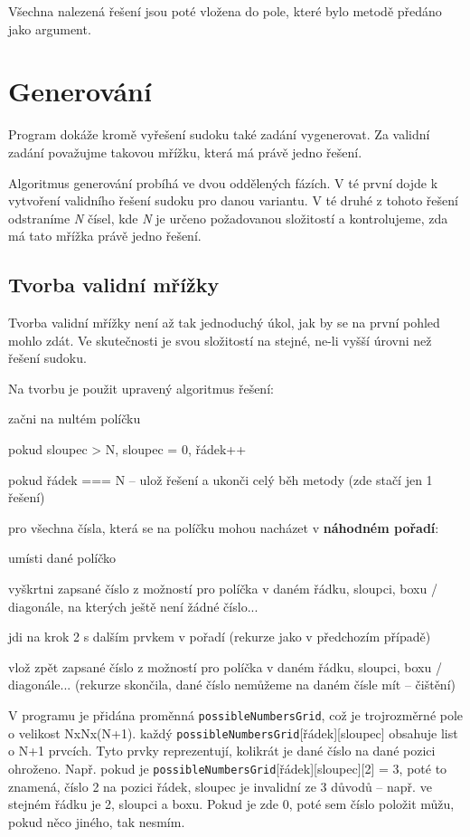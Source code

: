 \documentclass[a4paper,oneside,12pt]{report}
\begin{document}
Všechna nalezená řešení jsou poté vložena do pole, které bylo metodě předáno jako argument.

\section{Generování}
Program dokáže kromě vyřešení sudoku také zadání vygenerovat. Za validní zadání považujme takovou mřížku, která má právě jedno řešení.

Algoritmus generování probíhá ve dvou oddělených fázích. V té první dojde k vytvoření validního řešení sudoku pro danou variantu. V té druhé z tohoto řešení odstraníme \textit{N} čísel, kde \textit{N} je určeno požadovanou složitostí a kontrolujeme, zda má tato mřížka právě jedno řešení.

\subsection{Tvorba validní mřížky}
Tvorba validní mřížky není až tak jednoduchý úkol, jak by se na první pohled mohlo zdát. Ve skutečnosti je svou složitostí na stejné, ne-li vyšší úrovni než řešení sudoku.

Na tvorbu je použit upravený algoritmus řešení:
\begin{algEnumerate}
   \item začni na nultém políčku
   \item pokud sloupec > N, sloupec = 0, řádek++
   \item pokud řádek === N -- ulož řešení a ukonči celý běh metody (zde stačí jen 1 řešení)
   \item pro všechna čísla, která se na políčku mohou nacházet v \textbf{náhodném pořadí}:
   \begin{algEnumerate}
      \item umísti dané políčko
      \item vyškrtni zapsané číslo z možností pro políčka v daném řádku, sloupci, boxu / diagonále, na kterých ještě není žádné číslo...
      \item jdi na krok 2 s dalším prvkem v pořadí (rekurze jako v předchozím případě)
      \item vlož zpět zapsané číslo z možností pro políčka v daném řádku, sloupci, boxu / diagonále... (rekurze skončila, dané číslo nemůžeme na daném čísle mít -- čištění)
   \end{algEnumerate}
\end{algEnumerate}

V programu je přidána proměnná \texttt{possibleNumbersGrid}, což je trojrozměrné pole o velikost NxNx(N+1). každý \texttt{possibleNumbersGrid}[řádek][sloupec] obsahuje list o N+1 prvcích. Tyto prvky reprezentují, kolikrát je dané číslo na dané pozici ohroženo. Např. pokud je \texttt{possibleNumbersGrid}[řádek][sloupec][2] = 3, poté to znamená, číslo 2 na pozici řádek, sloupec je invalidní ze 3 důvodů -- např. ve stejném řádku je 2, sloupci a boxu. Pokud je zde 0, poté sem číslo položit můžu, pokud něco jiného, tak nesmím.
\end{document}
